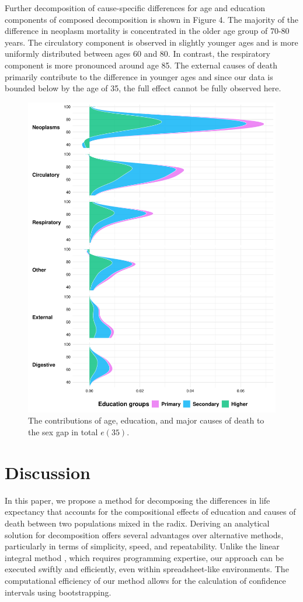 \documentclass[12pt, sn-apa,pdflatex,letterpaper]{sn-jnl}
\begin{document}
Further decomposition of cause-specific differences for age and education components of composed decomposition is shown in Figure 4. The majority of the difference in neoplasm mortality is concentrated in the older age group of 70-80 years. The circulatory component is observed in slightly younger ages and is more uniformly distributed between ages 60 and 80. In contrast, the respiratory component is more pronounced around age 85. The external causes of death primarily contribute to the difference in younger ages and since our data is bounded below by the age of 35, the full effect cannot be fully observed here.

\begin{figure}[ht!]
    \centering
    \includegraphics[width=0.8\linewidth]{manuscript/fig4.pdf}
    \caption{The contributions of age, education, and major causes of death to the sex gap in total $e(35)$.}
    \label{fig:enter-label}
\end{figure}

\FloatBarrier

\section*{Discussion}\label{discussion}

In this paper, we propose a method for decomposing the differences in life expectancy that accounts for the compositional effects of education and causes of death between two populations mixed in the radix. Deriving an analytical solution for decomposition offers several advantages over alternative methods, particularly in terms of simplicity, speed, and repeatability. Unlike the linear integral method \citet{horiuchi2008decomposition}, which requires programming expertise, our approach can be executed swiftly and efficiently, even within spreadsheet-like environments. The computational efficiency of our method allows for the calculation of confidence intervals using bootstrapping.
\end{document}

